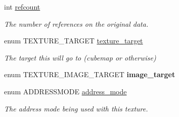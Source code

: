 \begin{DoxyCompactItemize}
\item 
int \hyperlink{classTexture_ab9b8539453dedc8763c5395be406dee6}{refcount}\hypertarget{classTexture_ab9b8539453dedc8763c5395be406dee6}{}\label{classTexture_ab9b8539453dedc8763c5395be406dee6}

\begin{DoxyCompactList}\small\item\em The number of references on the original data. \end{DoxyCompactList}\item 
enum T\+E\+X\+T\+U\+R\+E\+\_\+\+T\+A\+R\+G\+ET \hyperlink{classTexture_ae2c36cb036ba6661e8e1e3281f63a204}{texture\+\_\+target}\hypertarget{classTexture_ae2c36cb036ba6661e8e1e3281f63a204}{}\label{classTexture_ae2c36cb036ba6661e8e1e3281f63a204}

\begin{DoxyCompactList}\small\item\em The target this will go to (cubemap or otherwise) \end{DoxyCompactList}\item 
enum T\+E\+X\+T\+U\+R\+E\+\_\+\+I\+M\+A\+G\+E\+\_\+\+T\+A\+R\+G\+ET {\bfseries image\+\_\+target}\hypertarget{classTexture_aece3d961e45967bd6bcf6f1b88e82de9}{}\label{classTexture_aece3d961e45967bd6bcf6f1b88e82de9}

\item 
enum A\+D\+D\+R\+E\+S\+S\+M\+O\+DE \hyperlink{classTexture_af3605a5ea18f32b7669cf0db94b12fe6}{address\+\_\+mode}\hypertarget{classTexture_af3605a5ea18f32b7669cf0db94b12fe6}{}\label{classTexture_af3605a5ea18f32b7669cf0db94b12fe6}

\begin{DoxyCompactList}\small\item\em The address mode being used with this texture. \end{DoxyCompactList}\end{DoxyCompactItemize}
